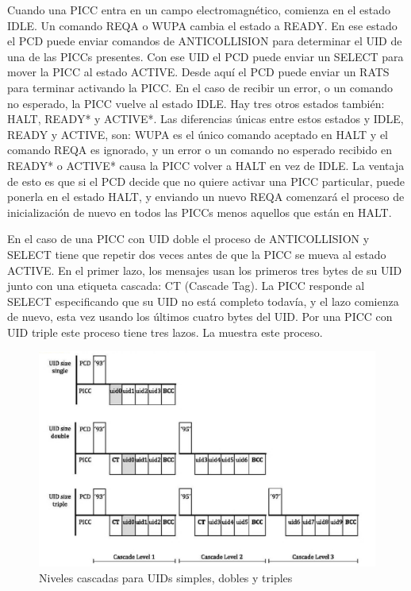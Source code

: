 \documentclass[a4paper, twoside, 11pt]{report}
\begin{document}
\FloatBarrier

Cuando una PICC entra en un campo electromagnético, comienza en el estado IDLE. Un comando REQA o WUPA cambia el estado a READY. En ese estado el PCD puede enviar comandos de ANTICOLLISION para determinar el UID de una de las PICCs presentes. Con ese UID el PCD puede enviar un SELECT para mover la PICC al estado ACTIVE. Desde aquí el PCD puede enviar un RATS para terminar activando la PICC. En el caso de recibir un error, o un comando no esperado, la PICC vuelve al estado IDLE. Hay tres otros estados también: HALT, READY* y ACTIVE*. Las diferencias únicas entre estos estados y IDLE, READY y ACTIVE, son: WUPA es el único comando aceptado en HALT y el comando REQA es ignorado, y un error o un comando no esperado recibido en READY* o ACTIVE* causa la PICC volver a HALT en vez de IDLE. La ventaja de esto es que si el PCD decide que no quiere activar una PICC particular, puede ponerla en el estado HALT, y enviando un nuevo REQA comenzará el proceso de inicialización de nuevo en todos las PICCs menos aquellos que están en HALT.

En el caso de una PICC con UID doble el proceso de ANTICOLLISION y SELECT tiene que repetir dos veces antes de que la PICC se mueva al estado ACTIVE. En el primer lazo, los mensajes usan los primeros tres bytes de su UID junto con una etiqueta cascada: CT (Cascade Tag). La PICC responde al SELECT especificando que su UID no está completo todavía, y el lazo comienza de nuevo, esta vez usando los últimos cuatro bytes del UID. Por una PICC con UID triple este proceso tiene tres lazos. La  muestra este proceso.

\begin{figure}[htb]
  \centering
  \includegraphics[scale=0.75]{./img/cascade_levels}
  \caption{Niveles cascadas para UIDs simples, dobles y triples~\cite{iso14443-3}}
  \label{fig:cascade_levels}
\end{figure}
\end{document}
